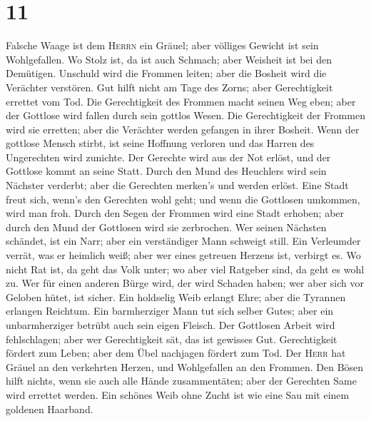 \hypertarget{section-10}{%
\section{11}\label{section-10}}

 Falsche Waage ist dem \textsc{Herrn} ein Gräuel; aber
völliges Gewicht ist sein Wohlgefallen.  Wo Stolz ist, da
ist auch Schmach; aber Weisheit ist bei den Demütigen. 
Unschuld wird die Frommen leiten; aber die Bosheit wird die Verächter
verstören.  Gut hilft nicht am Tage des Zorns; aber
Gerechtigkeit errettet vom Tod.  Die Gerechtigkeit des
Frommen macht seinen Weg eben; aber der Gottlose wird fallen durch sein
gottlos Wesen.  Die Gerechtigkeit der Frommen wird sie
erretten; aber die Verächter werden gefangen in ihrer Bosheit.
 Wenn der gottlose Mensch stirbt, ist seine Hoffnung
verloren und das Harren des Ungerechten wird zunichte. 
Der Gerechte wird aus der Not erlöst, und der Gottlose kommt an seine
Statt.  Durch den Mund des Heuchlers wird sein Nächster
verderbt; aber die Gerechten merken's und werden erlöst. 
Eine Stadt freut sich, wenn's den Gerechten wohl geht; und wenn die
Gottlosen umkommen, wird man froh.  Durch den Segen der
Frommen wird eine Stadt erhoben; aber durch den Mund der Gottlosen wird
sie zerbrochen.  Wer seinen Nächsten schändet, ist ein
Narr; aber ein verständiger Mann schweigt still.  Ein
Verleumder verrät, was er heimlich weiß; aber wer eines getreuen Herzens
ist, verbirgt es.  Wo nicht Rat ist, da geht das Volk
unter; wo aber viel Ratgeber sind, da geht es wohl zu. 
Wer für einen anderen Bürge wird, der wird Schaden haben; wer aber sich
vor Geloben hütet, ist sicher.  Ein holdselig Weib
erlangt Ehre; aber die Tyrannen erlangen Reichtum.  Ein
barmherziger Mann tut sich selber Gutes; aber ein unbarmherziger betrübt
auch sein eigen Fleisch.  Der Gottlosen Arbeit wird
fehlschlagen; aber wer Gerechtigkeit sät, das ist gewisses Gut.
 Gerechtigkeit fördert zum Leben; aber dem Übel nachjagen
fördert zum Tod.  Der \textsc{Herr} hat Gräuel an den
verkehrten Herzen, und Wohlgefallen an den Frommen.  Den
Bösen hilft nichts, wenn sie auch alle Hände zusammentäten; aber der
Gerechten Same wird errettet werden.  Ein schönes Weib
ohne Zucht ist wie eine Sau mit einem goldenen Haarband. 
